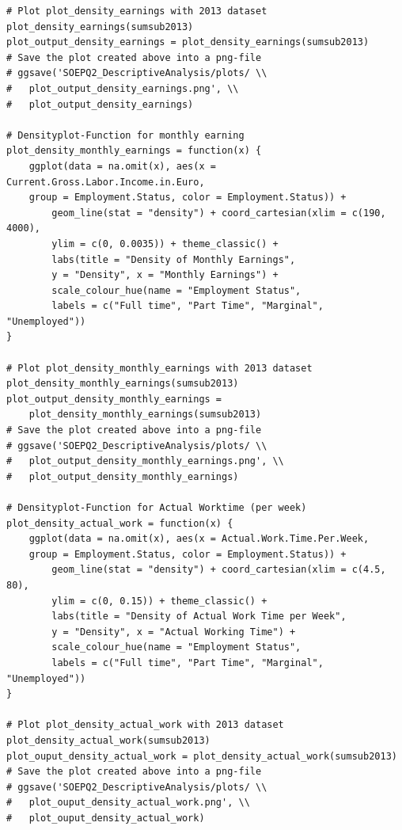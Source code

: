 \documentclass[a4paper]{article}
\begin{document}
{\begin{lstlisting}
# Plot plot_density_earnings with 2013 dataset
plot_density_earnings(sumsub2013)
plot_output_density_earnings = plot_density_earnings(sumsub2013)
# Save the plot created above into a png-file 
# ggsave('SOEPQ2_DescriptiveAnalysis/plots/ \\
# 	plot_output_density_earnings.png', \\
# 	plot_output_density_earnings)

# Densityplot-Function for monthly earning
plot_density_monthly_earnings = function(x) {
    ggplot(data = na.omit(x), aes(x = Current.Gross.Labor.Income.in.Euro, 
    group = Employment.Status, color = Employment.Status)) + 
        geom_line(stat = "density") + coord_cartesian(xlim = c(190, 4000), 
        ylim = c(0, 0.0035)) + theme_classic() + 
        labs(title = "Density of Monthly Earnings", 
        y = "Density", x = "Monthly Earnings") + 
        scale_colour_hue(name = "Employment Status", 
        labels = c("Full time", "Part Time", "Marginal", "Unemployed"))
}

# Plot plot_density_monthly_earnings with 2013 dataset
plot_density_monthly_earnings(sumsub2013)
plot_output_density_monthly_earnings = 
	plot_density_monthly_earnings(sumsub2013)
# Save the plot created above into a png-file 
# ggsave('SOEPQ2_DescriptiveAnalysis/plots/ \\
#	plot_output_density_monthly_earnings.png', \\
# 	plot_output_density_monthly_earnings)

# Densityplot-Function for Actual Worktime (per week)
plot_density_actual_work = function(x) {
    ggplot(data = na.omit(x), aes(x = Actual.Work.Time.Per.Week, 
    group = Employment.Status, color = Employment.Status)) + 
        geom_line(stat = "density") + coord_cartesian(xlim = c(4.5, 80), 
        ylim = c(0, 0.15)) + theme_classic() + 
        labs(title = "Density of Actual Work Time per Week", 
        y = "Density", x = "Actual Working Time") + 
        scale_colour_hue(name = "Employment Status", 
        labels = c("Full time", "Part Time", "Marginal", "Unemployed"))
}

# Plot plot_density_actual_work with 2013 dataset
plot_density_actual_work(sumsub2013)
plot_ouput_density_actual_work = plot_density_actual_work(sumsub2013)
# Save the plot created above into a png-file 
# ggsave('SOEPQ2_DescriptiveAnalysis/plots/ \\ 
# 	plot_ouput_density_actual_work.png', \\
# 	plot_ouput_density_actual_work)


\end{lstlisting}}
\end{document}
